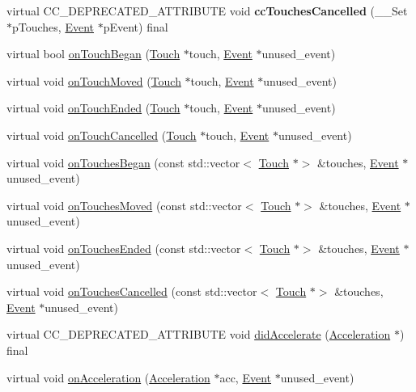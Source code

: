\begin{DoxyCompactItemize}
virtual C\+C\+\_\+\+D\+E\+P\+R\+E\+C\+A\+T\+E\+D\+\_\+\+A\+T\+T\+R\+I\+B\+U\+TE void {\bfseries cc\+Touches\+Cancelled} (\+\_\+\+\_\+\+Set $\ast$p\+Touches, \hyperlink{classEvent}{Event} $\ast$p\+Event) final
\item 
virtual bool \hyperlink{classLayer_af51202b4ab21e485ccc8f502103c5672}{on\+Touch\+Began} (\hyperlink{classTouch}{Touch} $\ast$touch, \hyperlink{classEvent}{Event} $\ast$unused\+\_\+event)
\item 
virtual void \hyperlink{classLayer_a282a91b3508a3f5d77ffcc765800878e}{on\+Touch\+Moved} (\hyperlink{classTouch}{Touch} $\ast$touch, \hyperlink{classEvent}{Event} $\ast$unused\+\_\+event)
\item 
virtual void \hyperlink{classLayer_a953c3166b987743f281b03c003a98859}{on\+Touch\+Ended} (\hyperlink{classTouch}{Touch} $\ast$touch, \hyperlink{classEvent}{Event} $\ast$unused\+\_\+event)
\item 
virtual void \hyperlink{classLayer_a47f3275e8c91e68d9a7230e44c0706ee}{on\+Touch\+Cancelled} (\hyperlink{classTouch}{Touch} $\ast$touch, \hyperlink{classEvent}{Event} $\ast$unused\+\_\+event)
\item 
virtual void \hyperlink{classLayer_aff1b8435f8f420498162153b0e71c70b}{on\+Touches\+Began} (const std\+::vector$<$ \hyperlink{classTouch}{Touch} $\ast$$>$ \&touches, \hyperlink{classEvent}{Event} $\ast$unused\+\_\+event)
\item 
virtual void \hyperlink{classLayer_aab61c8121d4765a5956c8348e0bd49d9}{on\+Touches\+Moved} (const std\+::vector$<$ \hyperlink{classTouch}{Touch} $\ast$$>$ \&touches, \hyperlink{classEvent}{Event} $\ast$unused\+\_\+event)
\item 
virtual void \hyperlink{classLayer_a5bcef7ed687630bfd02e0de57f066c6f}{on\+Touches\+Ended} (const std\+::vector$<$ \hyperlink{classTouch}{Touch} $\ast$$>$ \&touches, \hyperlink{classEvent}{Event} $\ast$unused\+\_\+event)
\item 
virtual void \hyperlink{classLayer_aeb1f39e95ed1940697aa6fe9de0d6419}{on\+Touches\+Cancelled} (const std\+::vector$<$ \hyperlink{classTouch}{Touch} $\ast$$>$ \&touches, \hyperlink{classEvent}{Event} $\ast$unused\+\_\+event)
\item 
virtual C\+C\+\_\+\+D\+E\+P\+R\+E\+C\+A\+T\+E\+D\+\_\+\+A\+T\+T\+R\+I\+B\+U\+TE void \hyperlink{classLayer_ad38c31e14fb4fb9561eede982d6b8ef5}{did\+Accelerate} (\hyperlink{classAcceleration}{Acceleration} $\ast$) final
\item 
virtual void \hyperlink{classLayer_a85943c6937c71bafbbde26980eec9007}{on\+Acceleration} (\hyperlink{classAcceleration}{Acceleration} $\ast$acc, \hyperlink{classEvent}{Event} $\ast$unused\+\_\+event)

\end{DoxyCompactItemize}

